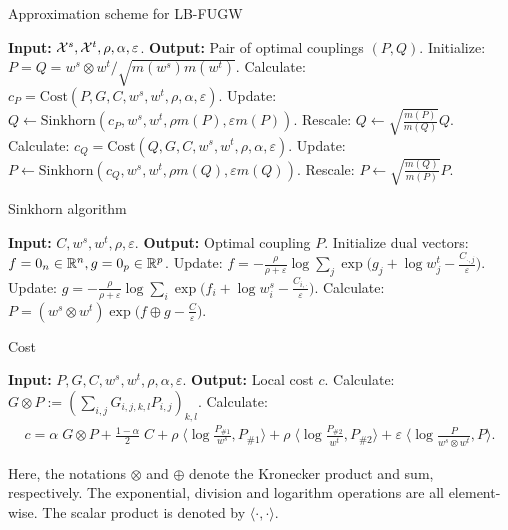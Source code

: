\begin{algorithm}[t]
  \caption{Approximation scheme for LB-FUGW}
  \label{alg:lbfugw}
  \begin{algorithmic}[1]
      \STATE \textbf{Input:} $\mathcal X^s, \mathcal X^t, \rho, \alpha, \varepsilon$.
      \STATE \textbf{Output:} Pair of optimal couplings $(P, Q)$.
      \STATE Initialize: $P = Q = w^s \otimes w^t / \sqrt{m(w^s) m(w^t)}$.
          \STATE Calculate: $c_P = \text{Cost}(P,  G, C, w^s, w^t, \rho, \alpha, \varepsilon)$.
          \STATE Update: $Q \gets \text{Sinkhorn}(c_P, w^s, w^t, \rho m(P), \varepsilon m(P))$.
          \STATE Rescale: $Q \gets \sqrt{\frac{m(P)}{m(Q)}} Q$.
          \STATE Calculate: $c_Q = \text{Cost}(Q,  G, C, w^s, w^t, \rho, \alpha, \varepsilon)$.
          \STATE Update: $P \gets \text{Sinkhorn}(c_Q, w^s, w^t, \rho m(Q), \varepsilon m(Q))$.
          \STATE Rescale: $P \gets \sqrt{\frac{m(Q)}{m(P)}} P$.
      \ENDWHILE
  \end{algorithmic}
\end{algorithm}

\begin{algorithm}[h]
  \caption{Sinkhorn algorithm \citep{Sejourne19}}
  \label{alg:sinkhorn}
  \begin{algorithmic}[1]
      \STATE \textbf{Input:} $C, w^s, w^t, \rho, \varepsilon$.
      \STATE \textbf{Output:} Optimal coupling $P$.
      \STATE Initialize dual vectors: $f = 0_n \in \mathbb R^n, g = 0_p \in \mathbb R^p$.
          \STATE Update: $f = -\frac{\rho}{\rho + \varepsilon} \log \sum_j \exp \big( g_j + \log w^t_j - \frac{C_{\cdot,j}}{\varepsilon} \big)$.
        \STATE Update: $g = -\frac{\rho}{\rho + \varepsilon} \log \sum_i \exp \big( f_i + \log w^s_i - \frac{C_{i,\cdot}}{\varepsilon} \big)$.
      \ENDWHILE
      \STATE Calculate: $P = (w^s \otimes w^t) \exp \big(f \oplus g - \frac{C}{\varepsilon} \big)$.
  \end{algorithmic}
\end{algorithm}

\begin{algorithm}[h]
  \caption{Cost}
  \label{alg:local_cost}
  \begin{algorithmic}[1]
      \STATE \textbf{Input:} $P, G, C, w^s, w^t, \rho, \alpha, \varepsilon$.
      \STATE \textbf{Output:} Local cost $c$.
      \STATE Calculate: $G \otimes P := \left( \sum_{i,j} G_{i,j,k,l} P_{i,j} \right)_{k,l}$.
      \STATE Calculate:
      \begin{align}
          c = \alpha \; G \otimes P + \frac{1 - \alpha}{2} \; C +
          \rho \; \langle \log \frac{P_{\#1}}{w^s}, P_{\#1} \rangle +
          \rho \; \langle \log \frac{P_{\#2}}{w^t}, P_{\#2} \rangle +
          \varepsilon \; \langle \log \frac{P}{w^s \otimes w^t}, P \rangle.
      \end{align}
  \end{algorithmic}
\end{algorithm}
Here, the notations $\otimes$ and $\oplus$ denote the Kronecker product and sum, respectively.
The exponential, division and logarithm operations are all element-wise.
The scalar product is denoted by $\langle \cdot, \cdot \rangle$.

